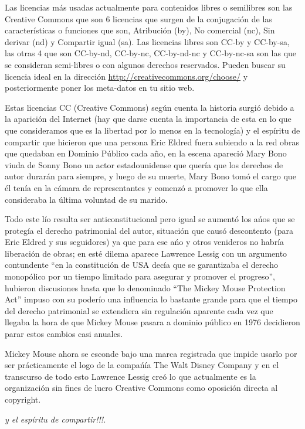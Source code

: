 \begin{multicols}{2}
Las licencias más usadas actualmente para contenidos libres o semilibres son las Creative Commons que son 6 licencias que surgen de la conjugación de las características o funciones que son, Atribución (by), No comercial (nc), Sin derivar (nd) y Compartir igual (sa). Las licencias libres\cite {ref2} son CC-by y CC-by-sa, las otras 4 que son CC-by-nd, CC-by-nc, CC-by-nd-nc y CC-by-nc-sa son las que se consideran semi-libres o con algunos derechos reservados. Pueden buscar su licencia ideal en la dirección \url{http://creativecommons.org/choose/} y posteriormente poner los meta-datos en tu sitio web.

Estas licencias CC (Creative Commons) según cuenta la historia surgió debido a la aparición del Internet (hay que darse cuenta la importancia de esta en lo que que consideramos que es la libertad por lo menos en la tecnología) y el espíritu de compartir que hicieron que una persona Eric Eldred fuera subiendo a la red obras que quedaban en Dominio Público cada año, en la escena apareció Mary Bono viuda de Sonny Bono un actor estadounidense que quería que los derechos de autor durarán para siempre, y luego de su muerte, Mary Bono tomó el cargo que él tenía en la cámara de representantes y comenzó a promover lo que ella consideraba la última voluntad de su marido.

Todo este lío resulta ser anticonstitucional pero igual se aumentó los ańos que se protegía el derecho patrimonial del autor, situación que causó descontento (para Eric Eldred y sus seguidores) ya que para ese ańo y otros venideros no habría liberación de obras; en esté dilema aparece Lawrence Lessig con un argumento contundente ``en la constitución de USA decía que se garantizaba el derecho monopólico por un tiempo limitado para asegurar y promover el progreso'', hubieron discusiones hasta que lo denominado ``The Mickey Mouse Protection Act''\cite {ref3} impuso con su poderío una influencia lo bastante grande para que el tiempo del derecho patrimonial se extendiera sin regulación aparente cada vez que llegaba la hora de que Mickey Mouse pasara a dominio público\cite {ref4} en 1976 decidieron parar estos cambios casi anuales. 

Mickey Mouse ahora se esconde bajo una marca registrada que impide usarlo por ser prácticamente el logo de la compańía The Walt Disney Company y en el transcurso de todo esto Lawrence Lessig creó lo que actualmente es la organización sin fines de lucro Creative Commons como oposición directa al copyright.

\begin{entradilla} %
{\em {\color{introcolor}{Internet}} y el espíritu de compartir!!!.}
\end{entradilla}
\end{multicols}

